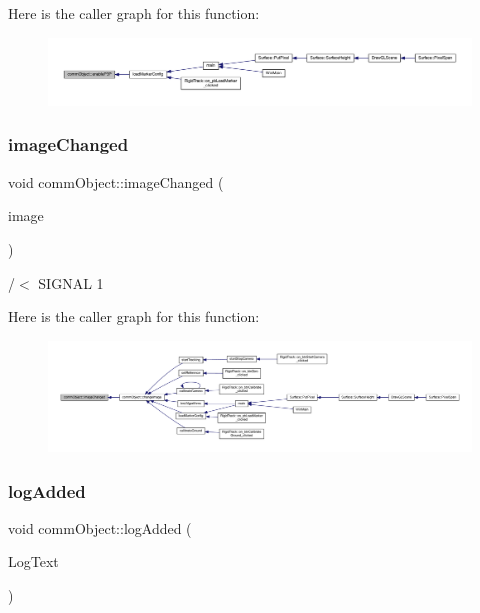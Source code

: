 Here is the caller graph for this function\+:
\nopagebreak
\begin{figure}[H]
\begin{center}
\leavevmode
\includegraphics[width=350pt]{classcomm_object_a7552116eb5e18c49c6dcf943de29af7a_icgraph}
\end{center}
\end{figure}
\mbox{\label{classcomm_object_a3828eab6be234f6216a6f80a6a82e41e}} 
\subsubsection{\texorpdfstring{image\+Changed}{imageChanged}}
{\footnotesize\ttfamily void comm\+Object\+::image\+Changed (\begin{DoxyParamCaption}\item[{Q\+Pixmap}]{image }\end{DoxyParamCaption})\hspace{0.3cm}{\ttfamily [signal]}}



/$<$ S\+I\+G\+N\+AL 1 

Here is the caller graph for this function\+:
\nopagebreak
\begin{figure}[H]
\begin{center}
\leavevmode
\includegraphics[width=350pt]{classcomm_object_a3828eab6be234f6216a6f80a6a82e41e_icgraph}
\end{center}
\end{figure}
\mbox{\label{classcomm_object_a72620fe1bac16309baf6d148644edaf9}} 
\subsubsection{\texorpdfstring{log\+Added}{logAdded}}
{\footnotesize\ttfamily void comm\+Object\+::log\+Added (\begin{DoxyParamCaption}\item[{Q\+String}]{Log\+Text }\end{DoxyParamCaption})\hspace{0.3cm}{\ttfamily [signal]}}



